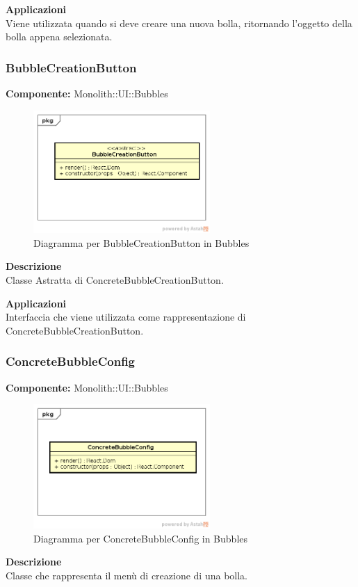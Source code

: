 \textbf{Applicazioni}\\
Viene utilizzata quando si deve creare una nuova bolla, ritornando l'oggetto della bolla appena selezionata. 


\clearpage

\subsubsection{BubbleCreationButton}
\textbf{Componente:}  Monolith::UI::Bubbles\\
   \FloatBarrier
   \begin{figure}[ht]
   \centering
   \includegraphics[width=0.6\textwidth]{img/single-BubbleCreationButton}
   \caption{{Diagramma per BubbleCreationButton in Bubbles}}
\end{figure}
\FloatBarrier
\textbf{Descrizione}\\
Classe Astratta di ConcreteBubbleCreationButton. 


\textbf{Applicazioni}\\
Interfaccia che viene utilizzata come rappresentazione di ConcreteBubbleCreationButton. 


\clearpage

\subsubsection{ConcreteBubbleConfig}
\textbf{Componente:}  Monolith::UI::Bubbles\\
   \FloatBarrier
   \begin{figure}[ht]
   \centering
   \includegraphics[width=0.6\textwidth]{img/single-ConcreteBubbleConfig}
   \caption{{Diagramma per ConcreteBubbleConfig in Bubbles}}
\end{figure}
\FloatBarrier
\textbf{Descrizione}\\
Classe che rappresenta il menù di creazione di una bolla.


